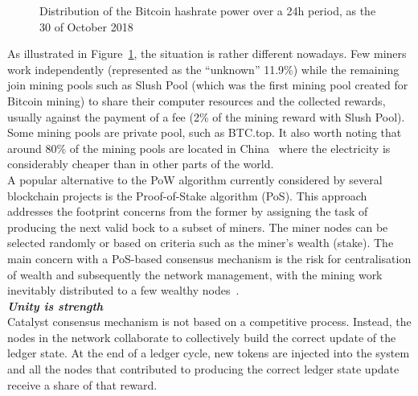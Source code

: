\begin{figure}[H]
\caption{\label{fig:pools} Distribution of the Bitcoin hashrate power over a 24h period, as the 30 of October 2018\cite{bc24}}
\end{figure}

As illustrated in Figure~\ref{fig:pools}, the situation is rather different nowadays. Few miners work independently (represented as the “unknown” 11.9\%) while the remaining join mining pools such as Slush Pool (which was the first mining pool created for Bitcoin mining) to share their computer resources and the collected rewards, usually against the payment of a fee (2\% of the mining reward with Slush Pool). Some mining pools are private pool, such as BTC.top. It also worth noting that around 80\% of the mining pools are located in China~\cite{poolcent} where the electricity is considerably cheaper than in other parts of the world.   \\

A popular alternative to the PoW algorithm currently considered by several blockchain projects is the Proof-of-Stake algorithm (PoS). This approach addresses the footprint concerns from the former by assigning the task of producing the next valid bock to a subset of miners. The miner nodes can be selected randomly or based on criteria such as the miner’s wealth (stake). The main concern with a PoS-based consensus mechanism is the risk for centralisation of wealth and subsequently the network management, with the mining work inevitably distributed to a few wealthy nodes~\cite{PoSr}.\\

\textbf{\textit{Unity is strength}}\\
Catalyst consensus mechanism is not based on a competitive process. Instead, the nodes in the network collaborate to collectively build the correct update of the ledger state. At the end of a ledger cycle, new tokens are injected into the system and all the nodes that contributed to producing the correct ledger state update receive a share of that reward.

